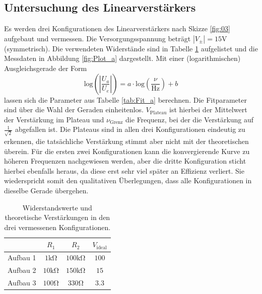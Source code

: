 \subsection{Untersuchung des Linearverstärkers}
Es werden drei Konfigurationen des Linearverstärkers nach Skizze \ref{fig:03} aufgebaut und vermessen. Die Versorgungsspannung beträgt $\left|V_{\pm}\right|=15\si{\volt}$ (symmetrisch). Die verwendeten Widerstände sind in Tabelle \ref{tab:Data_a} aufgelistet und die Messdaten in Abbildung \ref{fig:Plot_a} dargestellt. Mit einer (logarithmischen) Ausgleichsgerade der Form
\begin{equation}
  \text{log}\left(\left|\frac{U_a}{U_e}\right|\right) = a\cdot\text{log}\left(\frac{\nu}{\text{Hz}}\right) + b
  \label{eqn:log_fit}
\end{equation}
lassen sich die Parameter aus Tabelle \ref{tab:Fit_a} berechnen. Die Fitparameter sind über die Wahl der Geraden einheitenlos. $V_{\text{Plateau}}$ ist hierbei der Mittelwert der Verstärkung im Plateau und $\nu_{\text{Grenz}}$ die Frequenz, bei der die Verstärkung auf $\frac{1}{\sqrt{2}}$ abgefallen ist.
Die Plateaus sind in allen drei Konfigurationen eindeutig zu erkennen, die tatsächliche Verstärkung stimmt aber nicht mit der theoretischen überein. Für die ersten zwei Konfigurationen kann die konvergierende Kurve zu höheren Frequenzen nachgewiesen werden, aber die dritte Konfiguration sticht hierbei ebenfalls heraus, da diese erst sehr viel später an Effizienz verliert. Sie wiederspricht somit den qualitativen Überlegungen, dass alle Konfigurationen in dieselbe Gerade übergehen.
\FloatBarrier
\begin{table}
  \centering
  \caption{Widerstandswerte und theoretische Verstärkungen in den drei vermessenen Konfigurationen.}
  \label{tab:Data_a}
  \begin{tabular}{c|ccc}
    \toprule
              & $R_1$              & $R_2$               & $V_{\text{ideal}}$\\
    \midrule
    Aufbau 1  & $1\si{\kilo\ohm}$  & $100\si{\kilo\ohm}$ & $100$\\
    Aufbau 2  & $10\si{\kilo\ohm}$ & $150\si{\kilo\ohm}$ & $15$\\
    Aufbau 3  & $100\si{\ohm}$     & $330\si{\ohm}$      & $3.3$\\
    \bottomrule
  \end{tabular}
\end{table}
\FloatBarrier
\FloatBarrier
